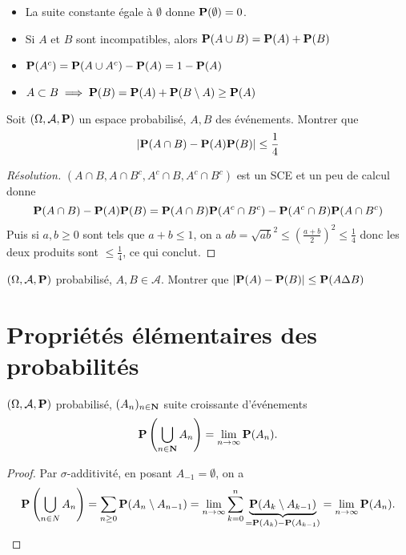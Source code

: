 \begin{rem}
    \begin{itemize}
        \item La suite constante égale à $\emptyset$ donne $\P(\emptyset)=0$.
        \item Si $A$ et $B$ sont incompatibles, alors $\P(A\cup B)=\P(A)+\P(B)$ 
        \item $\P(A^c)=\P(A\cup A^c)-\P(A)=1-\P(A)$
        \item $A\subset B \implies \P(B)=\P(A)+\P(B\setminus A)\geq \P(A)$
    \end{itemize}
\end{rem}

\begin{exo}
    Soit $(\Omega, \mathcal A, \P)$ un espace probabilisé, $A, B$ des événements. Montrer que \[
        |\P(A\cap B)-\P(A)\P(B)|\leq \frac{1}{4}
    \]
\end{exo}

\begin{proof}[Résolution]
    $(A\cap B, A\cap B^c, A^c\cap B, A^c\cap B^c)$ est un SCE et un peu de calcul donne \[
        \P(A\cap B)-\P(A)\P(B)=\P(A\cap B)\P(A^c\cap B^c)-\P(A^c\cap B)\P(A\cap B^c)
    \]
    Puis si $a,b\geq 0$ sont tels que $a+b\leq 1$, on a $ab=\sqrt{ab}^2\leq \left( \frac{a+b}{2} \right) ^2\leq \frac{1}{4}$ donc les deux produits sont $\leq \frac{1}{4}$, ce qui conclut.
\end{proof}

\begin{exo}
    $(\Omega, \mathcal A, \P)$ probabilisé, $A, B \in \mathcal A$. Montrer que $|\P(A)-\P(B)| \leq \P(A\Delta B)$
\end{exo}

\section{Propriétés élémentaires des probabilités}

\begin{thm}
    \Hyp $(\Omega, \mathcal A, \P)$ probabilisé, $(A_n)_{n\in \N}$ suite croissante d'événements
    \Conc \[
        \P\left(\bigcup_{n\in \N}A_n \right)=\lim_{n \to \infty} \P(A_n).
    \]
\end{thm}

\begin{proof} Par $\sigma$-additivité, en posant $A_{-1}=\emptyset$, on a
    \[
        \P\left( \bigcup_{n\in N} A_n \right) =\sum_{n\geq 0}\P(A_n\setminus A_{n-1})= \lim_{n \to \infty} \sum_{k=0}^{n} \underbrace{\P(A_k\setminus A_{k-1})}_{=\P(A_k)-\P(A_{k-1})}=\lim_{n \to \infty} \P(A_n).
    \]
\end{proof}

